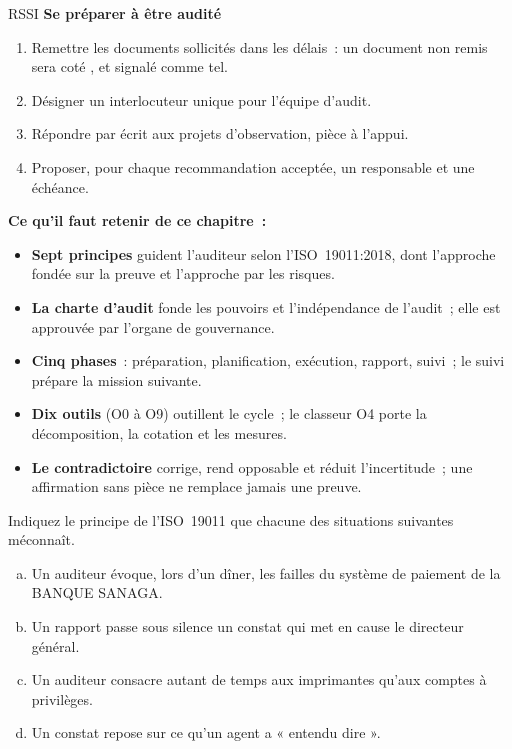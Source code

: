 \begin{boxmetier}{RSSI}
\textbf{Se préparer à être audité}
\begin{enumerate}
    \item Remettre les documents sollicités dans les délais~: un document
          non remis sera coté \NEK{}, et signalé comme tel.
    \item Désigner un interlocuteur unique pour l'équipe d'audit.
    \item Répondre par écrit aux projets d'observation, pièce à l'appui.
    \item Proposer, pour chaque recommandation acceptée, un responsable et
          une échéance.
\end{enumerate}
\end{boxmetier}

\separateur

\begin{boxresume}
\textbf{Ce qu'il faut retenir de ce chapitre~:}
\begin{itemize}
    \item \textbf{Sept principes} guident l'auditeur selon l'ISO~19011:2018,
          dont l'approche fondée sur la preuve et l'approche par les risques.
    \item \textbf{La charte d'audit} fonde les pouvoirs et l'indépendance de
          l'audit~; elle est approuvée par l'organe de gouvernance.
    \item \textbf{Cinq phases}~: préparation, planification, exécution,
          rapport, suivi~; le suivi prépare la mission suivante.
    \item \textbf{Dix outils} (O0 à O9) outillent le cycle~; le classeur O4
          porte la décomposition, la cotation et les mesures.
    \item \textbf{Le contradictoire} corrige, rend opposable et réduit
          l'incertitude~; une affirmation sans pièce ne remplace jamais une
          preuve.
\end{itemize}
\end{boxresume}

\bigskip

\begin{boxexo}[title={\ding{45}\quad Exercice~5.1. Quel principe~? \niveaubase}]
Indiquez le principe de l'ISO~19011 que chacune des situations suivantes
méconnaît.
\begin{enumerate}[(a)]
    \item Un auditeur évoque, lors d'un dîner, les failles du système de
          paiement de la BANQUE SANAGA.
    \item Un rapport passe sous silence un constat qui met en cause le
          directeur général.
    \item Un auditeur consacre autant de temps aux imprimantes qu'aux
          comptes à privilèges.
    \item Un constat repose sur ce qu'un agent a « entendu dire ».
\end{enumerate}
\end{boxexo}

